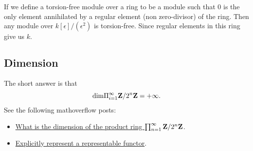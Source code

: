\documentclass[../main.tex]{subfiles}
\begin{document}
\begin{remark}
If we define a torsion-free module over a ring to be a module such that $0$ is the only element annihilated by a regular element (non zero-divisor) of the ring. Then any module over $k[\epsilon]/(\epsilon^{2})$ is torsion-free. Since regular elements in this ring give us $k$.
\end{remark}




\subsection{Dimension}


\begin{example}[$\mathrm{dim}(X)=1$ with one or two closed points]

\end{example}
\begin{example}[$\dim \Pi_{n=1}^{\infty} \Z/2^{n}\Z$]
The short answer is that 
$$\mathrm{dim}\Pi_{i=1}^{\infty} \mathbf{Z}/2^{n}\mathbf{Z}=+\infty.$$
See the following mathoverflow posts:
\begin{itemize}
    \item \href{https://mathoverflow.net/questions/90980/what-is-the-dimension-of-the-product-ring-prod-mathbb-z-2n-mathbb-z}{What is the dimension of the product ring $\prod_{n=1}^{\infty}\mathbf{Z}/2^{n}\mathbf{Z}$}.
    \item \href{https://math.stackexchange.com/questions/364479/explicitly-represent-a-representable-functor}{Explicitly represent a representable functor}.
\end{itemize}
\end{example}
\end{document}
